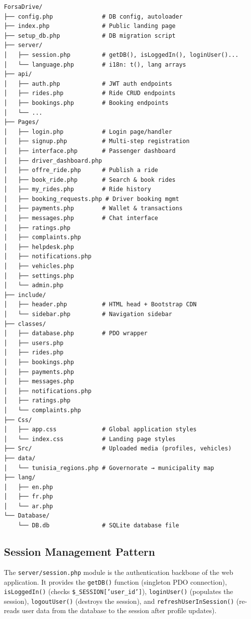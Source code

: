 \documentclass[12pt,a4paper,openright]{report}
\begin{document}
\begin{lstlisting}[basicstyle=\ttfamily\small, numbers=none, frame=none, caption={Project Directory Structure}]
ForsaDrive/
├── config.php              # DB config, autoloader
├── index.php               # Public landing page
├── setup_db.php            # DB migration script
├── server/
│   ├── session.php         # getDB(), isLoggedIn(), loginUser()...
│   └── language.php        # i18n: t(), lang arrays
├── api/
│   ├── auth.php            # JWT auth endpoints
│   ├── rides.php           # Ride CRUD endpoints
│   ├── bookings.php        # Booking endpoints
│   └── ...
├── Pages/
│   ├── login.php           # Login page/handler
│   ├── signup.php          # Multi-step registration
│   ├── interface.php       # Passenger dashboard
│   ├── driver_dashboard.php
│   ├── offre_ride.php      # Publish a ride
│   ├── book_ride.php       # Search & book rides
│   ├── my_rides.php        # Ride history
│   ├── booking_requests.php # Driver booking mgmt
│   ├── payments.php        # Wallet & transactions
│   ├── messages.php        # Chat interface
│   ├── ratings.php
│   ├── complaints.php
│   ├── helpdesk.php
│   ├── notifications.php
│   ├── vehicles.php
│   ├── settings.php
│   └── admin.php
├── include/
│   ├── header.php          # HTML head + Bootstrap CDN
│   └── sidebar.php         # Navigation sidebar
├── classes/
│   ├── database.php        # PDO wrapper
│   ├── users.php
│   ├── rides.php
│   ├── bookings.php
│   ├── payments.php
│   ├── messages.php
│   ├── notifications.php
│   ├── ratings.php
│   └── complaints.php
├── Css/
│   ├── app.css             # Global application styles
│   └── index.css           # Landing page styles
├── Src/                    # Uploaded media (profiles, vehicles)
├── data/
│   └── tunisia_regions.php # Governorate → municipality map
├── lang/
│   ├── en.php
│   ├── fr.php
│   └── ar.php
└── Database/
    └── DB.db               # SQLite database file
\end{lstlisting}

\subsection{Session Management Pattern}

The \texttt{server/session.php} module is the authentication backbone of the web application. It provides the \texttt{getDB()} function (singleton PDO connection), \texttt{isLoggedIn()} (checks \texttt{\$\_SESSION['user\_id']}), \texttt{loginUser()} (populates the session), \texttt{logoutUser()} (destroys the session), and \texttt{refreshUserInSession()} (re-reads user data from the database to the session after profile updates).
\end{document}
